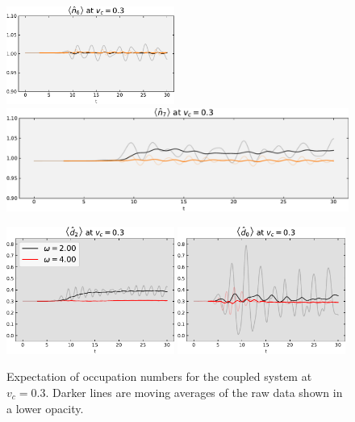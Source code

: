 \begin{figure}[!hbt]
{{\begin{minipage}[b]{.59\textwidth}
                \includegraphics[trim=0 0 0 -4, clip, width=0.49\textwidth]{graph/occupation/occupation_site_6_vc_03.pdf}
                \includegraphics[trim=0 0 0 -4, clip, width=1.00\textwidth]{graph/occupation/occupation_site_7_vc_03.pdf}
       \caption{Expectation of occupation numbers for the coupled system at $v_c = 0.3$. Darker lines are moving averages of the raw data shown in a lower opacity.}
        \label{fig:occupation_vc_03}
    \end{minipage}
    \hfill
    \begin{minipage}[b]{.59\textwidth}
                \centering
                \includegraphics[width=0.49\textwidth]{graph/double_occupation/double_occupation_vc_03_site_2.pdf}
                \includegraphics[width=0.49\textwidth]{graph/double_occupation/double_occupation_vc_03_site_0.pdf}

\end{minipage}}}
\end{figure}
